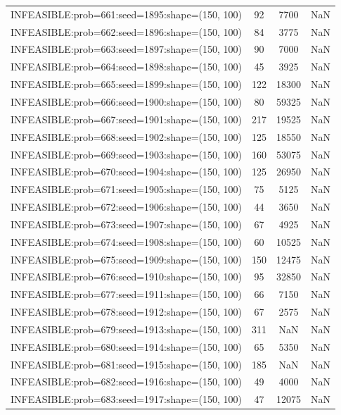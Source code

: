 \begin{longtable}{lccc}
INFEASIBLE:prob=661:seed=1895:shape=(150, 100) &    92 &  7700 &    NaN \\
INFEASIBLE:prob=662:seed=1896:shape=(150, 100) &    84 &  3775 &    NaN \\
INFEASIBLE:prob=663:seed=1897:shape=(150, 100) &    90 &  7000 &    NaN \\
INFEASIBLE:prob=664:seed=1898:shape=(150, 100) &    45 &  3925 &    NaN \\
INFEASIBLE:prob=665:seed=1899:shape=(150, 100) &   122 & 18300 &    NaN \\
INFEASIBLE:prob=666:seed=1900:shape=(150, 100) &    80 & 59325 &    NaN \\
INFEASIBLE:prob=667:seed=1901:shape=(150, 100) &   217 & 19525 &    NaN \\
INFEASIBLE:prob=668:seed=1902:shape=(150, 100) &   125 & 18550 &    NaN \\
INFEASIBLE:prob=669:seed=1903:shape=(150, 100) &   160 & 53075 &    NaN \\
INFEASIBLE:prob=670:seed=1904:shape=(150, 100) &   125 & 26950 &    NaN \\
INFEASIBLE:prob=671:seed=1905:shape=(150, 100) &    75 &  5125 &    NaN \\
INFEASIBLE:prob=672:seed=1906:shape=(150, 100) &    44 &  3650 &    NaN \\
INFEASIBLE:prob=673:seed=1907:shape=(150, 100) &    67 &  4925 &    NaN \\
INFEASIBLE:prob=674:seed=1908:shape=(150, 100) &    60 & 10525 &    NaN \\
INFEASIBLE:prob=675:seed=1909:shape=(150, 100) &   150 & 12475 &    NaN \\
INFEASIBLE:prob=676:seed=1910:shape=(150, 100) &    95 & 32850 &    NaN \\
INFEASIBLE:prob=677:seed=1911:shape=(150, 100) &    66 &  7150 &    NaN \\
INFEASIBLE:prob=678:seed=1912:shape=(150, 100) &    67 &  2575 &    NaN \\
INFEASIBLE:prob=679:seed=1913:shape=(150, 100) &   311 &   NaN &    NaN \\
INFEASIBLE:prob=680:seed=1914:shape=(150, 100) &    65 &  5350 &    NaN \\
INFEASIBLE:prob=681:seed=1915:shape=(150, 100) &   185 &   NaN &    NaN \\
INFEASIBLE:prob=682:seed=1916:shape=(150, 100) &    49 &  4000 &    NaN \\
INFEASIBLE:prob=683:seed=1917:shape=(150, 100) &    47 & 12075 &    NaN \\

\end{longtable}
